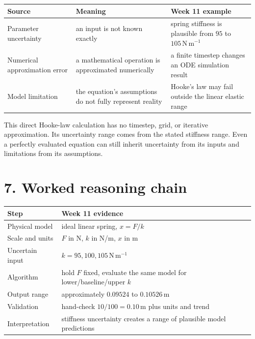 \documentclass[11pt,a4paper]{article}
\newcommand{\units}[1]{\,\mathrm{#1}}
\begin{document}
\begin{center}\small
\begin{tabular}{>{\raggedright\arraybackslash}p{.22\linewidth}>{\raggedright\arraybackslash}p{.34\linewidth}>{\raggedright\arraybackslash}p{.34\linewidth}}
\toprule
Source & Meaning & Week 11 example \\
\midrule
Parameter uncertainty & an input is not known exactly & spring stiffness is plausible from $95$ to $105\units{N\,m^{-1}}$ \\
Numerical approximation error & a mathematical operation is approximated numerically & a finite timestep changes an ODE simulation result \\
Model limitation & the equation's assumptions do not fully represent reality & Hooke's law may fail outside the linear elastic range \\
\bottomrule
\end{tabular}
\end{center}

This direct Hooke-law calculation has no timestep, grid, or iterative approximation. Its uncertainty range comes from the stated stiffness range. Even a perfectly evaluated equation can still inherit uncertainty from its inputs and limitations from its assumptions.

\section*{7. Worked reasoning chain}
\begin{center}\small
\begin{tabular}{p{.25\linewidth}p{.67\linewidth}}
\toprule
Step & Week 11 evidence \\
\midrule
Physical model & ideal linear spring, $x=F/k$ \\
Scale and units & $F$ in N, $k$ in N/m, $x$ in m \\
Uncertain input & $k=95,100,105\units{N\,m^{-1}}$ \\
Algorithm & hold $F$ fixed, evaluate the same model for lower/baseline/upper $k$ \\
Output range & approximately $0.09524$ to $0.10526\units{m}$ \\
Validation & hand-check $10/100=0.10\units{m}$ plus units and trend \\
Interpretation & stiffness uncertainty creates a range of plausible model predictions \\
\bottomrule
\end{tabular}
\end{center}
\end{document}
